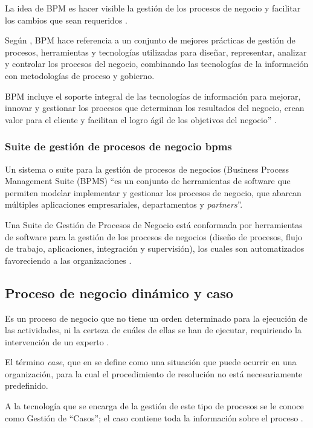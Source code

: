 La idea de BPM es hacer visible la gestión de los procesos de negocio y facilitar los cambios que sean requeridos \citep{smith2003business}.

Según \citet{garimella2008introduccion}, BPM hace referencia a un conjunto de mejores prácticas de gestión de procesos, herramientas y tecnologías utilizadas para diseñar, representar, analizar y controlar los procesos del negocio, combinando las tecnologías de la información con metodologías de proceso y gobierno.

BPM incluye el soporte integral de las tecnologías de información para mejorar, innovar y gestionar los procesos que determinan los resultados del negocio, crean valor para el cliente y facilitan el logro ágil de los objetivos del negocio” \citep{abpmp2013v3}.

\subsubsection{Suite de gestión de procesos de negocio bpms}

Un sistema o suite para la gestión de procesos de negocios (Business Process Management Suite (BPMS) “es un conjunto de herramientas de software que permiten modelar implementar y gestionar los procesos de negocio, que abarcan múltiples aplicaciones empresariales, departamentos y \textit{partners}”\citep{smith2003business}.

Una Suite de Gestión de Procesos de Negocio está conformada por herramientas de software para la gestión de los procesos de negocios (diseño de procesos, flujo de trabajo, aplicaciones, integración y supervisión), los cuales son automatizados favoreciendo a las organizaciones \citep{underdahl2013gestion}.

\subsection{Proceso de negocio dinámico y caso}

Es un proceso de negocio que no tiene un orden determinado para la ejecución de las actividades, ni la certeza de cuáles de ellas se han de ejecutar, requiriendo la intervención de un experto \citep{hitpass2017bpmn}. 

El término \textit{case}, que en \cite{van2005case} se define como una situación que puede ocurrir en una organización, para la cual el procedimiento de resolución no está necesariamente predefinido.

A la tecnología que se encarga de la gestión de este tipo de procesos se le conoce como Gestión de “Casos”; el caso contiene toda la información sobre el proceso \citep{marin2016introduction}.

